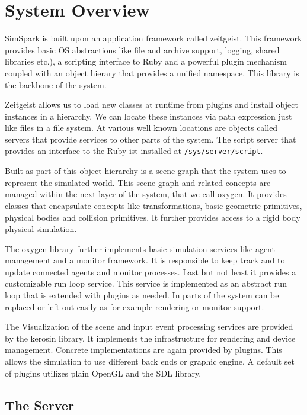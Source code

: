  \chapter{System Overview}
\label{cha:overview}


SimSpark is built upon an application framework called zeitgeist. This
framework provides basic OS abstractions like file and archive
support, logging, shared libraries etc.), a scripting interface to
Ruby and a powerful plugin mechanism coupled with an object hierary
that provides a unified namespace. This library is the backbone of the
system.

Zeitgeist allows us to load new classes at runtime from plugins and
install object instances in a hierarchy. We can locate these instances
via path expression just like files in a file system. At various well
known locations are objects called servers that provide services to
other parts of the system. The script server that provides an
interface to the Ruby ist installed at \texttt{/sys/server/script}.

Built as part of this object hierarchy is a scene graph that the
system uses to represent the simulated world. This scene graph and
related concepts are managed within the next layer of the system, that
we call oxygen. It provides classes that encapsulate concepts like
transformations, basic geometric primitives, physical bodies and
collision primitives. It further provides access to a rigid body
physical simulation.

The oxygen library further implements basic simulation services like
agent management and a monitor framework. It is responsible to keep
track and to update connected agents and monitor processes. Last but
not least it provides a customizable run loop service. This service is
implemented as an abstract run loop that is extended with plugins as
needed. In parts of the system can be replaced or left out easily as
for example rendering or monitor support.

The Visualization of the scene and input event processing services are
provided by the kerosin library. It implements the infrastructure for
rendering and device management. Concrete implementations are again
provided by plugins. This allows the simulation to use different back
ends or graphic engine. A default set of plugins utilizes plain OpenGL
and the SDL library.

\section{The Server}

